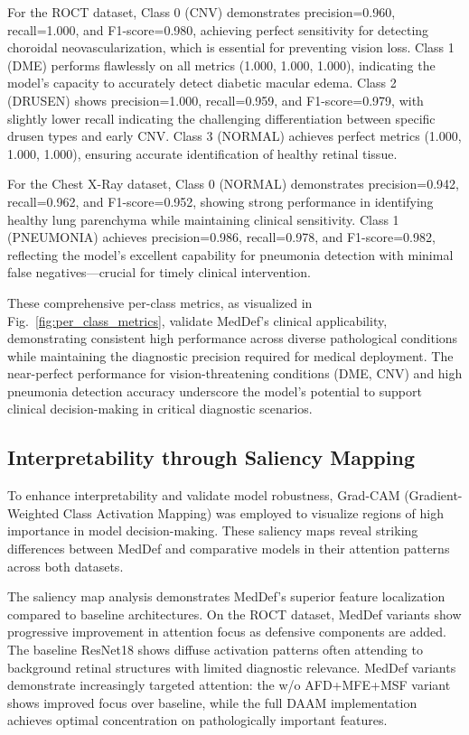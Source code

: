 \documentclass[preprint,12pt]{elsarticle}
\begin{document}
For the ROCT dataset, Class 0 (CNV) demonstrates precision=0.960, recall=1.000, and F1-score=0.980, achieving perfect sensitivity for detecting choroidal neovascularization, which is essential for preventing vision loss. Class 1 (DME) performs flawlessly on all metrics (1.000, 1.000, 1.000), indicating the model's capacity to accurately detect diabetic macular edema. Class 2 (DRUSEN) shows precision=1.000, recall=0.959, and F1-score=0.979, with slightly lower recall indicating the challenging differentiation between specific drusen types and early CNV. Class 3 (NORMAL) achieves perfect metrics (1.000, 1.000, 1.000), ensuring accurate identification of healthy retinal tissue.

For the Chest X-Ray dataset, Class 0 (NORMAL) demonstrates precision=0.942, recall=0.962, and F1-score=0.952, showing strong performance in identifying healthy lung parenchyma while maintaining clinical sensitivity. Class 1 (PNEUMONIA) achieves precision=0.986, recall=0.978, and F1-score=0.982, reflecting the model's excellent capability for pneumonia detection with minimal false negatives—crucial for timely clinical intervention.

These comprehensive per-class metrics, as visualized in Fig.~\ref{fig:per_class_metrics}, validate MedDef's clinical applicability, demonstrating consistent high performance across diverse pathological conditions while maintaining the diagnostic precision required for medical deployment. The near-perfect performance for vision-threatening conditions (DME, CNV) and high pneumonia detection accuracy underscore the model's potential to support clinical decision-making in critical diagnostic scenarios.

\subsection{Interpretability through Saliency Mapping}
To enhance interpretability and validate model robustness, Grad-CAM (Gradient-Weighted Class Activation Mapping) was employed to visualize regions of high importance in model decision-making. These saliency maps reveal striking differences between MedDef and comparative models in their attention patterns across both datasets.

The saliency map analysis demonstrates MedDef's superior feature localization compared to baseline architectures. On the ROCT dataset, MedDef variants show progressive improvement in attention focus as defensive components are added. The baseline ResNet18 shows diffuse activation patterns often attending to background retinal structures with limited diagnostic relevance. MedDef variants demonstrate increasingly targeted attention: the w/o AFD+MFE+MSF variant shows improved focus over baseline, while the full DAAM implementation achieves optimal concentration on pathologically important features.
\end{document}
